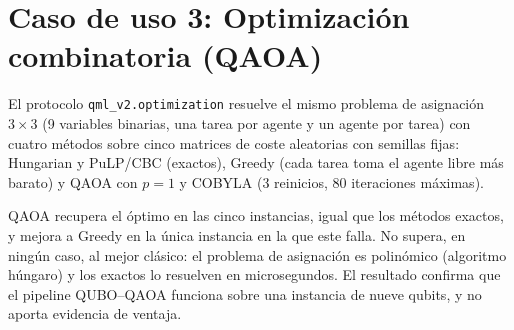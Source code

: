 \section{Caso de uso 3: Optimización combinatoria (QAOA)}

El protocolo \texttt{qml\_v2.optimization} resuelve el mismo problema de asignación $3\times3$ (9 variables binarias, una tarea por agente y un agente por tarea) con cuatro métodos sobre cinco matrices de coste aleatorias con semillas fijas: Hungarian y PuLP/CBC (exactos), Greedy (cada tarea toma el agente libre más barato) y QAOA con $p=1$ y COBYLA (3 reinicios, 80 iteraciones máximas).

\begin{table}[ht]
\centering
\small
{}
\caption{Caso~3: asignación $3\times3$, cinco instancias (semillas 42--46). La brecha se mide frente al óptimo exacto. Greedy falla en una instancia ($+35.2\%$). Los tiempos de QAOA dependen de la carga de la máquina; el orden de magnitud es el de un simulador de 9 qubits.}
\label{tab:asignacion}
\end{table}

QAOA recupera el óptimo en las cinco instancias, igual que los métodos exactos, y mejora a Greedy en la única instancia en la que este falla. No supera, en ningún caso, al mejor clásico: el problema de asignación es polinómico (algoritmo húngaro) y los exactos lo resuelven en microsegundos. El resultado confirma que el pipeline QUBO--QAOA funciona sobre una instancia de nueve qubits, y no aporta evidencia de ventaja.

